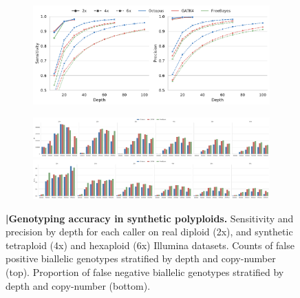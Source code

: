 \documentclass[notitlepage, twocolumn, 10pt]{article}
\begin{document}
\begin{figure}[ht!]
    \centering
\captionsetup[subfigure]{position=top,labelfont=bf,textfont=normalfont,singlelinecheck=off,justification=raggedright}
    \begin{subfigure}[b]{\textwidth}
    	\vspace{-0.8cm}
        \caption{}
        \includegraphics[width=\textwidth]{figures/sensitivity-and-precision-by-depth}
        \label{fig:synthetic:accuracy-by-depth}
    \end{subfigure}
    \begin{subfigure}[b]{\textwidth}
        \vspace{-1cm}
        \caption{}
        \includegraphics[width=\textwidth]{figures/hexaploid_gt_fp_10-60x}
        \includegraphics[width=\textwidth]{figures/hexaploid_gt_fn_perc_10-60x}
        \label{fig:synthetic:gt-errors}
    \end{subfigure}
    \vspace{-0.5cm}
    \caption{\textbf{|\:Genotyping accuracy in synthetic polyploids.} \protect{} Sensitivity and precision by depth for each caller on real diploid (2x), and synthetic tetraploid (4x) and hexaploid (6x) Illumina datasets. \protect{} Counts of false positive biallelic genotypes stratified by depth and copy-number (top). Proportion of false negative biallelic genotypes stratified by depth and copy-number (bottom).}
    \label{fig:synthetic}
\end{figure}
\end{document}
